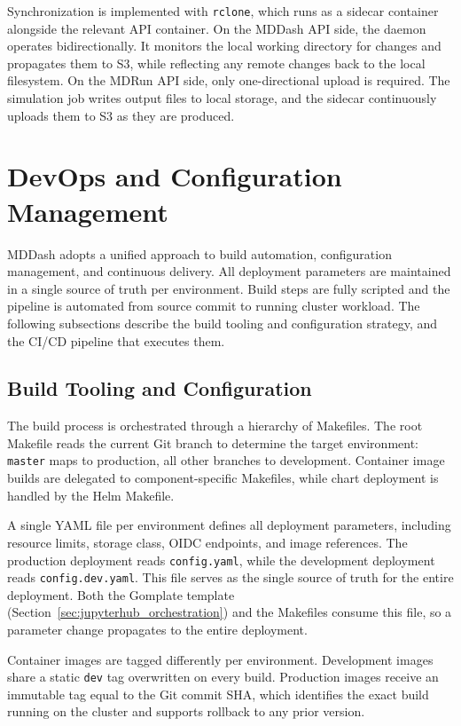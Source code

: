 \documentclass[
  digital,     %
  color,       %
  oneside,     %
  nosansbold,  %
  nocolorbold, %
  lof,         %
  lot,         %
]{fithesis4}
\begin{document}
Synchronization is implemented with \texttt{rclone}, which runs as a sidecar container alongside the relevant API container. On the MDDash API side, the daemon operates bidirectionally. It monitors the local working directory for changes and propagates them to S3, while reflecting any remote changes back to the local filesystem. On the MDRun API side, only one-directional upload is required. The simulation job writes output files to local storage, and the sidecar continuously uploads them to S3 as they are produced.

\section{DevOps and Configuration Management}
\label{sec:devops_configuration}

MDDash adopts a unified approach to build automation, configuration management, and continuous delivery. All deployment parameters are maintained in a single source of truth per environment. Build steps are fully scripted and the pipeline is automated from source commit to running cluster workload. The following subsections describe the build tooling and configuration strategy, and the CI/CD pipeline that executes them.

\subsection{Build Tooling and Configuration}

The build process is orchestrated through a hierarchy of Makefiles. The root Makefile reads the current Git branch to determine the target environment: \texttt{master} maps to production, all other branches to development. Container image builds are delegated to component-specific Makefiles, while chart deployment is handled by the Helm Makefile.

A single YAML file per environment defines all deployment parameters, including resource limits, storage class, OIDC endpoints, and image references. The production deployment reads \texttt{config.yaml}, while the development deployment reads \texttt{config.dev.yaml}. This file serves as the single source of truth for the entire deployment. Both the Gomplate template (Section~\ref{sec:jupyterhub_orchestration}) and the Makefiles consume this file, so a parameter change propagates to the entire deployment.

Container images are tagged differently per environment. Development images share a static \texttt{dev} tag overwritten on every build. Production images receive an immutable tag equal to the Git commit SHA, which identifies the exact build running on the cluster and supports rollback to any prior version.
\end{document}
